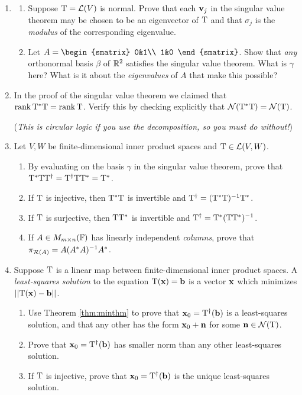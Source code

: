 \begin{exercises}
\begin{enumerate}
  
  \item\label{exs:specsingular}\begin{enumerate}
    \item Suppose $\mathrm{T}=\mathcal{L}(V)$ is normal. Prove that each ${\mathbf{v}}_j$ in the singular value theorem may be chosen to be an eigenvector of $\mathrm{T}$ and that $\sigma_j$ is the \emph{modulus} of the corresponding eigenvalue.
    \item Let $A=
    \begin{smatrix}
    	0&1\\
    	1&0
    \end{smatrix}$. Show that \emph{any} orthonormal basis $\beta$ of $\mathbb{R}^2$ satisfies the singular value theorem. What is $\gamma$ here? What is it about the \emph{eigenvalues} of $A$ that make this possible?
  \end{enumerate}
  
  
  \item\label{exs:ranktstart} In the proof of the singular value theorem we claimed that $\operatorname{rank} \mathrm{T}^*\mathrm{T}=\operatorname{rank}\mathrm{T}$. Verify this by checking explicitly that $\mathcal{N}(\mathrm{T}^*\mathrm{T})=\mathcal{N}(\mathrm{T})$.\par
  (\emph{This is circular logic if you use the decomposition, so you must do without!})
  

  \item Let $V,W$ be finite-dimensional inner product spaces and $\mathrm{T}\in\mathcal{L}(V,W)$.
  \begin{enumerate}
    \item By evaluating on the basis $\gamma$ in the singular value theorem, prove that $\mathrm{T}^*\mathrm{T}\mathrm{T}^\dag=\mathrm{T}^\dag\mathrm{T}\mathrm{T}^*=\mathrm{T}^*$.
    \item If $\mathrm{T}$ is injective, then $\mathrm{T}^*\mathrm{T}$ is invertible and $\mathrm{T}^\dag=(\mathrm{T}^*\mathrm{T})^{-1}\mathrm{T}^*$.
    \item If $\mathrm{T}$ is surjective, then $\mathrm{T}\mathrm{T}^*$ is invertible and $\mathrm{T}^\dag=\mathrm{T}^*(\mathrm{T}\mathrm{T}^*)^{-1}$.
    \item If $A\in M_{m\times n}(\mathbb{F})$ has linearly independent \emph{columns}, prove that $\pi_{\mathcal{R}(A)}=A(A^*A)^{-1}A^*$.
  \end{enumerate}
  
  
  \item\label{exs:leastsquares} Suppose $\mathrm{T}$ is a linear map between finite-dimensional inner product spaces. A \emph{least-squares solution} to the equation $\mathrm{T}({\mathbf{x}})={\mathbf{b}}$ is a vector ${\mathbf{x}}$ which minimizes $\left| \left| \mathrm{T}({\mathbf{x}})-{\mathbf{b}}\right|\right|$.
  \begin{enumerate}
    \item Use Theorem \ref{thm:minthm} to prove that ${\mathbf{x}}_0=\mathrm{T}^\dag({\mathbf{b}})$ is a least-squares solution, and that any other has the form ${\mathbf{x}}_0+{\mathbf{n}}$ for some ${\mathbf{n}}\in\mathcal{N}(\mathrm{T})$.
    \item Prove that ${\mathbf{x}}_0=\mathrm{T}^\dag({\mathbf{b}})$ has smaller norm than any other least-squares solution.
		\item If $\mathrm{T}$ is injective, prove that ${\mathbf{x}}_0=\mathrm{T}^\dag({\mathbf{b}})$ is the unique least-squares solution.
	\end{enumerate}


\end{enumerate}
\end{exercises}

